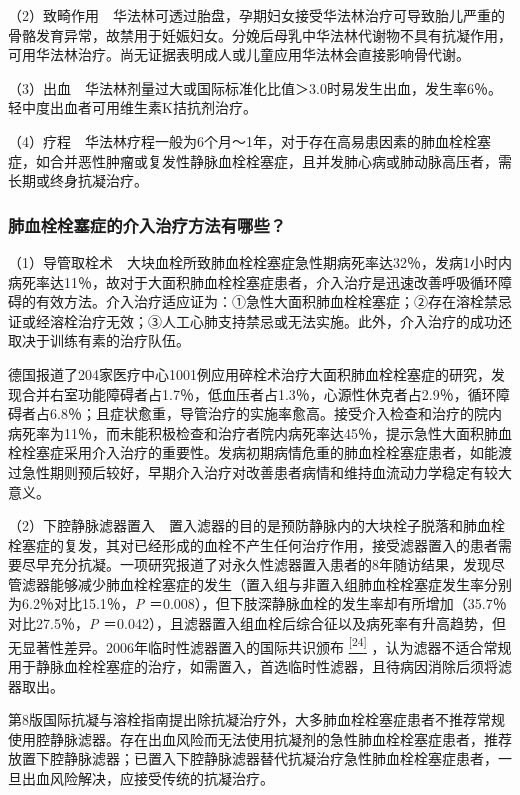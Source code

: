 （2）致畸作用　华法林可透过胎盘，孕期妇女接受华法林治疗可导致胎儿严重的骨骼发育异常，故禁用于妊娠妇女。分娩后母乳中华法林代谢物不具有抗凝作用，可用华法林治疗。尚无证据表明成人或儿童应用华法林会直接影响骨代谢。

（3）出血　华法林剂量过大或国际标准化比值＞3.0时易发生出血，发生率6％。轻中度出血者可用维生素K拮抗剂治疗。

（4）疗程　华法林疗程一般为6个月～1年，对于存在高易患因素的肺血栓栓塞症，如合并恶性肿瘤或复发性静脉血栓栓塞症，且并发肺心病或肺动脉高压者，需长期或终身抗凝治疗。

\subsubsection{肺血栓栓塞症的介入治疗方法有哪些？}

（1）导管取栓术　大块血栓所致肺血栓栓塞症急性期病死率达32％，发病1小时内病死率达11％，故对于大面积肺血栓栓塞症患者，介入治疗是迅速改善呼吸循环障碍的有效方法。介入治疗适应证为：①急性大面积肺血栓栓塞症；②存在溶栓禁忌证或经溶栓治疗无效；③人工心肺支持禁忌或无法实施。此外，介入治疗的成功还取决于训练有素的治疗队伍。

德国报道了204家医疗中心1001例应用碎栓术治疗大面积肺血栓栓塞症的研究，发现合并右室功能障碍者占1.7％，低血压者占1.3％，心源性休克者占2.9％，循环障碍者占6.8％；且症状愈重，导管治疗的实施率愈高。接受介入检查和治疗的院内病死率为11％，而未能积极检查和治疗者院内病死率达45％，提示急性大面积肺血栓栓塞症采用介入治疗的重要性。发病初期病情危重的肺血栓栓塞症患者，如能渡过急性期则预后较好，早期介入治疗对改善患者病情和维持血流动力学稳定有较大意义。

（2）下腔静脉滤器置入　置入滤器的目的是预防静脉内的大块栓子脱落和肺血栓栓塞症的复发，其对已经形成的血栓不产生任何治疗作用，接受滤器置入的患者需要尽早充分抗凝。一项研究报道了对永久性滤器置入患者的8年随访结果，发现尽管滤器能够减少肺血栓栓塞症的发生（置入组与非置入组肺血栓栓塞症发生率分别为6.2％对比15.1％，\emph{P}
＝0.008），但下肢深静脉血栓的发生率却有所增加（35.7％对比27.5％，\emph{P}
＝0.042），且滤器置入组血栓后综合征以及病死率有升高趋势，但无显著性差异。2006年临时性滤器置入的国际共识颁布
\protect\hyperlink{text00022.htmlux5cux23ch24-21}{\textsuperscript{{[}24{]}}}
，认为滤器不适合常规用于静脉血栓栓塞症的治疗，如需置入，首选临时性滤器，且待病因消除后须将滤器取出。

第8版国际抗凝与溶栓指南提出除抗凝治疗外，大多肺血栓栓塞症患者不推荐常规使用腔静脉滤器。存在出血风险而无法使用抗凝剂的急性肺血栓栓塞症患者，推荐放置下腔静脉滤器；已置入下腔静脉滤器替代抗凝治疗急性肺血栓栓塞症患者，一旦出血风险解决，应接受传统的抗凝治疗。

